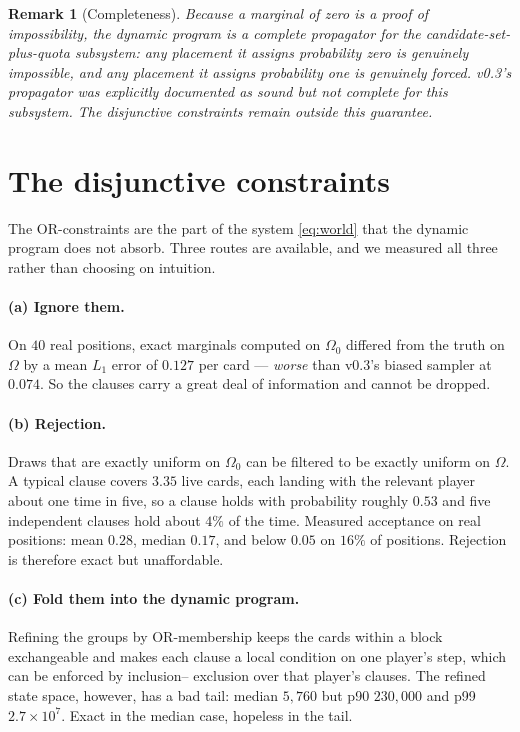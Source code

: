 \documentclass[11pt,a4paper]{article}
\newtheorem{remark}{Remark}
\begin{document}
\begin{remark}[Completeness]
Because a marginal of zero is a proof of impossibility, the dynamic program is
a \emph{complete} propagator for the candidate-set-plus-quota subsystem: any
placement it assigns probability zero is genuinely impossible, and any
placement it assigns probability one is genuinely forced. v0.3's propagator was
explicitly documented as sound but not complete for this subsystem. The
disjunctive constraints remain outside this guarantee.
\end{remark}

\section{The disjunctive constraints}
\label{sec:clauses}

The OR-constraints are the part of the system \eqref{eq:world} that the
dynamic program does not absorb. Three routes are available, and we measured
all three rather than choosing on intuition.

\paragraph{(a) Ignore them.} On $40$ real positions, exact marginals computed
on $\Omega_0$ differed from the truth on $\Omega$ by a mean $L_1$ error of
$0.127$ per card --- \emph{worse} than v0.3's biased sampler at $0.074$. So the
clauses carry a great deal of information and cannot be dropped.

\paragraph{(b) Rejection.} Draws that are exactly uniform on $\Omega_0$ can be
filtered to be exactly uniform on $\Omega$. A typical clause covers $3.35$ live
cards, each landing with the relevant player about one time in five, so a
clause holds with probability roughly $0.53$ and five independent clauses hold
about $4\%$ of the time. Measured acceptance on real positions: mean $0.28$,
median $0.17$, and below $0.05$ on $16\%$ of positions. Rejection is therefore
exact but unaffordable.

\paragraph{(c) Fold them into the dynamic program.} Refining the groups by
OR-membership keeps the cards within a block exchangeable and makes each clause
a local condition on one player's step, which can be enforced by inclusion--
exclusion over that player's clauses. The refined state space, however, has a
bad tail: median $5{,}760$ but p90 $230{,}000$ and p99 $2.7\times10^{7}$. Exact
in the median case, hopeless in the tail.
\end{document}
